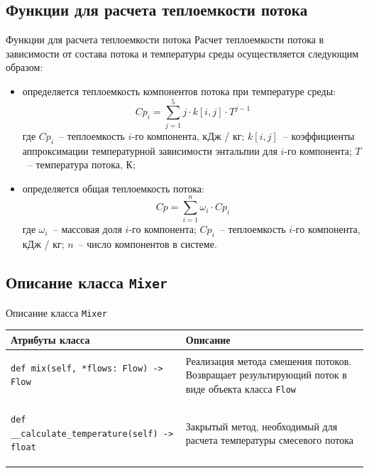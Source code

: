 \documentclass[aspectratio=169, mathserif]{beamer}%
\begin{document}
\subsection{Функции для расчета теплоемкости потока}
\begin{frame}[fragile]{Функции для расчета теплоемкости потока}
\scriptsize
Расчет теплоемкости потока в зависимости от состава потока и температуры среды осуществляется следующим образом:
\begin{itemize}
\item определяется теплоемкость компонентов потока при температуре среды:
\vfill
$$
	Cp_i = \sum \limits _{j=1} ^{5} j \cdot k\left[i, j\right] \cdot T^{j-1}
$$
\vfill
где $Cp_i$~-- теплоемкость $i$-го компонента, кДж / кг; $k\left[i, j\right]$~-- коэффициенты аппроксимации температурной зависимости энтальпии для $i$-го компонента; $T$~-- температура потока, К;
\vfill
\item определяется общая теплоемкость потока:
\vfill
$$
	Cp = \sum \limits _{i=1} ^{n} \omega _i \cdot Cp_i
$$
\vfill
где $\omega _i$~-- массовая доля $i$-го компонента; $Cp_i$~-- теплоемкость $i$-го компонента, кДж / кг; $n$~-- число компонентов в системе.
\end{itemize}
\vfill
\end{frame}


\subsection{Описание класса \texttt{Mixer}}
\begin{frame}[fragile]{Описание класса \texttt{Mixer}}
\scriptsize
\begin{table}[h!]
	\centering
	\renewcommand{\arraystretch}{1.2}
	\begin{tabular}{|p{.49\linewidth}|p{.49\linewidth}|}
		\hline
		\textbf{Атрибуты класса} & \textbf{Описание}  \\
		\hline
\begin{minipage}{\linewidth}
\vfill
\begin{verbatim}
def mix(self, *flows: Flow) -> Flow
\end{verbatim}
\vfill
\end{minipage}
		& Реализация метода смешения потоков. Возвращает результирующий поток в виде объекта класса \texttt{Flow}\\
		\hline
\begin{minipage}{\linewidth}
\vfill
\begin{verbatim}
def __calculate_temperature(self) -> float
\end{verbatim}
\vfill
\end{minipage}
		& Закрытый метод, необходимый для расчета температуры смесевого потока \\
		\hline
	\end{tabular}
\end{table}
\vfill
\end{frame}
\end{document}
